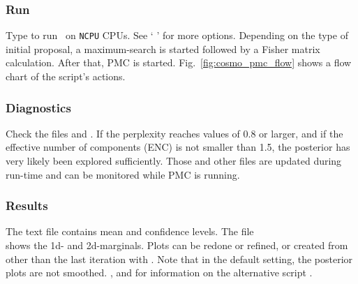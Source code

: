 \subsubsection*{Run}

Type
%
%
to run \CosmoPMC\ on \texttt{NCPU} CPUs. See
` ' for
more options. Depending on the type of initial proposal,
a maximum-search is started followed by a
Fisher matrix calculation. After that, PMC is
started. Fig.~\ref{fig:cosmo_pmc_flow} shows a flow chart of the
script's actions.


\subsubsection*{Diagnostics}

Check the files  and
. If the perplexity reaches values of 0.8 or larger, and
if the effective number of components (ENC) is not smaller than 1.5,
the posterior has very likely been explored sufficiently. Those and
other files are updated during run-time and can be monitored while PMC
is running. 


\subsubsection*{Results}

The text file  contains mean and
confidence levels. The file \\
 shows the 1d- and
2d-marginals. Plots can be redone or refined, or created from other
than the last iteration with
.
Note that in the default setting, the posterior plots are not
smoothed. , and
for information on the alternative script
.

